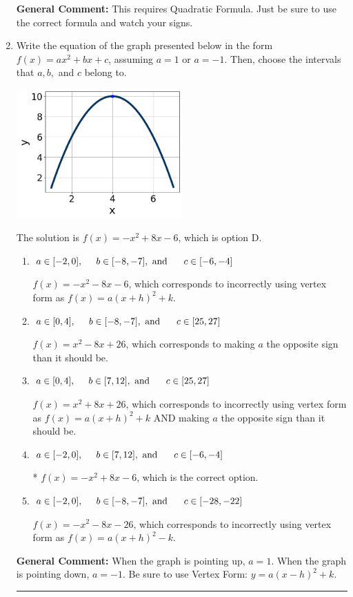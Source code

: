 \documentclass{extbook}[14pt]
\newcommand{\litem}[1]{\item #1

\rule{\textwidth}{0.4pt}}
\begin{document}
\begin{enumerate}
{\textbf{General Comment:} This requires Quadratic Formula. Just be sure to use the correct formula and watch your signs.
}
\litem{
Write the equation of the graph presented below in the form $f(x)=ax^2+bx+c$, assuming  $a=1$ or $a=-1$. Then, choose the intervals that $a, b,$ and $c$ belong to.

\begin{center}
    \includegraphics[width=0.5\textwidth]{../Figures/quadraticGraphToEquationB.png}
\end{center}




The solution is \( f(x) = -x^{2} +8 x -6 \), which is option D.\begin{enumerate}[label=\Alph*.]
\item \( a \in [-2, 0], \hspace*{5mm} b \in [-8, -7], \text{ and } \hspace*{5mm} c \in [-6, -4] \)

$f(x)=-x^{2} -8 x -6$, which corresponds to incorrectly using vertex form as $f(x) = a(x+h)^2+k$.
\item \( a \in [0, 4], \hspace*{5mm} b \in [-8, -7], \text{ and } \hspace*{5mm} c \in [25, 27] \)

$f(x)=x^{2} -8 x + 26$, which corresponds to making $a$ the opposite sign than it should be.
\item \( a \in [0, 4], \hspace*{5mm} b \in [7, 12], \text{ and } \hspace*{5mm} c \in [25, 27] \)

$f(x)=x^{2} +8 x + 26$, which corresponds to incorrectly using vertex form as $f(x) = a(x+h)^2+k$ AND making $a$ the opposite sign than it should be.
\item \( a \in [-2, 0], \hspace*{5mm} b \in [7, 12], \text{ and } \hspace*{5mm} c \in [-6, -4] \)

* $f(x)=-x^{2} +8 x -6$, which is the correct option.
\item \( a \in [-2, 0], \hspace*{5mm} b \in [-8, -7], \text{ and } \hspace*{5mm} c \in [-28, -22] \)

$f(x)=-x^{2} -8 x -26$, which corresponds to incorrectly using vertex form as $f(x) = a(x+h)^2 - k$.
\end{enumerate}

\textbf{General Comment:} When the graph is pointing up, $a=1$. When the graph is pointing down, $a=-1$. Be sure to use Vertex Form: $y = a(x-h)^2+k$.
}
\end{enumerate}
\end{document}
